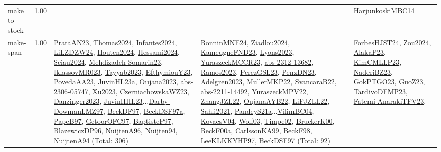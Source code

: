 {\begin{longtable}{p{3cm}r>{\raggedright\arraybackslash}p{6cm}>{\raggedright\arraybackslash}p{6cm}>{\raggedright\arraybackslash}p{8cm}}
\index{make to stock}\index{Concepts!make to stock}make to stock &  1.00 &  &  & \hyperref[detail:HarjunkoskiMBC14]{HarjunkoskiMBC14}\\
\index{make-span}\index{Concepts!make-span}make-span &  1.00 & \hyperref[detail:PrataAN23]{PrataAN23}, \hyperref[detail:Thomas2024]{Thomas2024}, \hyperref[detail:Infantes2024]{Infantes2024}, \hyperref[detail:LiLZDZW24]{LiLZDZW24}, \hyperref[detail:Houten2024]{Houten2024}, \hyperref[detail:Hessami2024]{Hessami2024}, \hyperref[detail:Sciau2024]{Sciau2024}, \hyperref[detail:Mehdizadeh-Somarin23]{Mehdizadeh-Somarin23}, \hyperref[detail:IklassovMR023]{IklassovMR023}, \hyperref[detail:Tayyab2023]{Tayyab2023}, \hyperref[detail:EfthymiouY23]{EfthymiouY23}, \hyperref[detail:PovedaAA23]{PovedaAA23}, \hyperref[detail:JuvinHL23a]{JuvinHL23a}, \hyperref[detail:Oujana2023]{Oujana2023}, \hyperref[detail:abs-2306-05747]{abs-2306-05747}, \hyperref[detail:Xu2023]{Xu2023}, \hyperref[detail:CzerniachowskaWZ23]{CzerniachowskaWZ23}, \hyperref[detail:Danzinger2023]{Danzinger2023}, \hyperref[detail:JuvinHHL23]{JuvinHHL23}...\hyperref[detail:Darby-DowmanLMZ97]{Darby-DowmanLMZ97}, \hyperref[detail:BeckDF97]{BeckDF97}, \hyperref[detail:BeckDSF97a]{BeckDSF97a}, \hyperref[detail:PapeB97]{PapeB97}, \hyperref[detail:GetoorOFC97]{GetoorOFC97}, \hyperref[detail:BaptisteP97]{BaptisteP97}, \hyperref[detail:BlazewiczDP96]{BlazewiczDP96}, \hyperref[detail:NuijtenA96]{NuijtenA96}, \hyperref[detail:Nuijten94]{Nuijten94}, \hyperref[detail:NuijtenA94]{NuijtenA94} (Total: 306) & \hyperref[detail:BonninMNE24]{BonninMNE24}, \hyperref[detail:Ziadlou2024]{Ziadlou2024}, \hyperref[detail:KameugneFND23]{KameugneFND23}, \hyperref[detail:Lyons2023]{Lyons2023}, \hyperref[detail:YuraszeckMCCR23]{YuraszeckMCCR23}, \hyperref[detail:abs-2312-13682]{abs-2312-13682}, \hyperref[detail:Ramos2023]{Ramos2023}, \hyperref[detail:PerezGSL23]{PerezGSL23}, \hyperref[detail:PenzDN23]{PenzDN23}, \hyperref[detail:Adelgren2023]{Adelgren2023}, \hyperref[detail:MullerMKP22]{MullerMKP22}, \hyperref[detail:SvancaraB22]{SvancaraB22}, \hyperref[detail:abs-2211-14492]{abs-2211-14492}, \hyperref[detail:YuraszeckMPV22]{YuraszeckMPV22}, \hyperref[detail:ZhangJZL22]{ZhangJZL22}, \hyperref[detail:OujanaAYB22]{OujanaAYB22}, \hyperref[detail:LiFJZLL22]{LiFJZLL22}, \hyperref[detail:Sahli2021]{Sahli2021}, \hyperref[detail:PandeyS21a]{PandeyS21a}...\hyperref[detail:VilimBC04]{VilimBC04}, \hyperref[detail:KovacsV04]{KovacsV04}, \hyperref[detail:Wolf03]{Wolf03}, \hyperref[detail:Timpe02]{Timpe02}, \hyperref[detail:BruckerK00]{BruckerK00}, \hyperref[detail:BeckF00a]{BeckF00a}, \hyperref[detail:CarlssonKA99]{CarlssonKA99}, \hyperref[detail:BeckF98]{BeckF98}, \hyperref[detail:LeeKLKKYHP97]{LeeKLKKYHP97}, \hyperref[detail:BeckDSF97]{BeckDSF97} (Total: 92) & \hyperref[detail:ForbesHJST24]{ForbesHJST24}, \hyperref[detail:Zou2024]{Zou2024}, \hyperref[detail:AlakaP23]{AlakaP23}, \hyperref[detail:KimCMLLP23]{KimCMLLP23}, \hyperref[detail:NaderiBZ23]{NaderiBZ23}, \hyperref[detail:GokPTGO23]{GokPTGO23}, \hyperref[detail:GuoZ23]{GuoZ23}, \hyperref[detail:TardivoDFMP23]{TardivoDFMP23}, \hyperref[detail:Fatemi-AnarakiTFV23]{Fatemi-AnarakiTFV23}, 
\end{longtable}}
